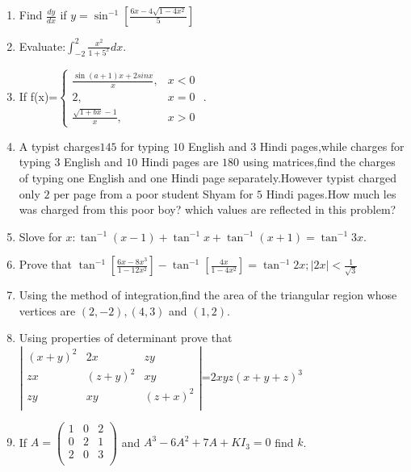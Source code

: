 \documentclass{article}
\begin{document}
\begin{enumerate}
   
 \item Find $\frac{dy}{dx}$ if $y=\sin^{-1}[\frac{6x-4\sqrt{1-4x^2}}{5}]$



  \item Evaluate:$\int_{-2}^{2}\frac{x^2}{1+5^x}dx$.

  \item If f(x)=$\begin{cases}
		  \frac{\sin(a+1)x+2 sinx}{x},&x<0\\
		  2,  &x=0\\
		  \frac{\sqrt{1+bx}-1}{x},&x>0
  \end{cases}$ .




 \item A typist charges\rupee$145$ for typing $10$ English and $3$ Hindi pages,while charges for typing $3$ English and $10$ Hindi pages are \rupee$180$ using matrices,find the charges of typing one English and one Hindi page separately.However typist charged only \rupee$2$  per page from a poor student Shyam for $5$ Hindi pages.How much les was charged from this poor boy? which values are reflected in this problem?

 \item Slove for $x:\tan^{-1}(x-1)+\tan^{-1}x+\tan^{-1}(x+1)=\tan^{-1}3x$.



 \item Prove that $\tan^{-1}[\frac{6x-8x^3}{1-12x^2}]-\tan^{-1}[\frac{4x}{1-4x^2}]=\tan^{-1}2x;|2x|<\frac{1}{\sqrt{3}}$



  \item Using the method of integration,find the area of the triangular region whose vertices are $(2,-2),(4,3)$ and $(1,2)$.


    \item Using properties of determinant prove that\\
	    $\left|\begin{matrix}
		    (x+y)^{2} & 2x &zy\\
		    zx & (z+y)^{2} & xy\\
		    zy & xy & (z+x)^{2}\\
	    \end{matrix}
	    \right|$=$2xyz(x+y+z)^{3}$


    \item If $A=\left(\begin{matrix}
		 1 & 0 & 2 \\
		 0 & 2 & 1 \\
		 2 & 0 & 3 \\
 \end{matrix}
 \right)$ and $A^3-6A^2+7A+KI_3=0$ find $k$.




\end{enumerate}
\end{document}
